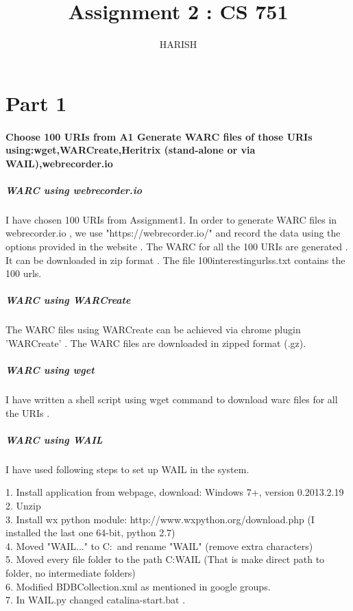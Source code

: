 \documentclass[12pt]{Report}
\begin{document}
\title{Assignment 2 : CS 751 }
\author{HARISH}

\maketitle

\section{Part 1}

\paragraph{Choose 100 URIs from A1
Generate WARC files of those URIs using:wget,WARCreate,Heritrix (stand-alone or via WAIL),webrecorder.io}

\subparagraph{WARC using webrecorder.io}


I have chosen 100 URIs from Assignment1. In order to generate WARC files in webrecorder.io , we use "https://webrecorder.io/" and record the data using the options provided in the website . The WARC for all the 100 URIs are generated . It can be downloaded in zip format . The file 100interestingurlss.txt contains the 100 urls.

\subparagraph{WARC using WARCreate}

The WARC files using WARCreate can be achieved via chrome plugin 'WARCreate' . The WARC files are downloaded in zipped format (.gz).

\subparagraph{WARC using wget }

I have written a shell script using wget command to download warc files for all the URIs . 

\subparagraph{WARC using WAIL}

I have used following steps to set up WAIL in the system.


1. Install application from webpage, download: Windows 7+, version 0.2013.2.19 \\
2. Unzip \\
3. Install wx python module: http://www.wxpython.org/download.php (I installed the last one 64-bit, python 2.7) \\
4. Moved "WAIL..." to C:\ and rename "WAIL" (remove extra characters) \\
5. Moved every file folder to the path C:WAIL (That is make direct path to folder, no intermediate folders) \\
6. Modified BDBCollection.xml as mentioned in google groups.\\
7. In WAIL.py changed catalina-start.bat . \\
\end{document}
